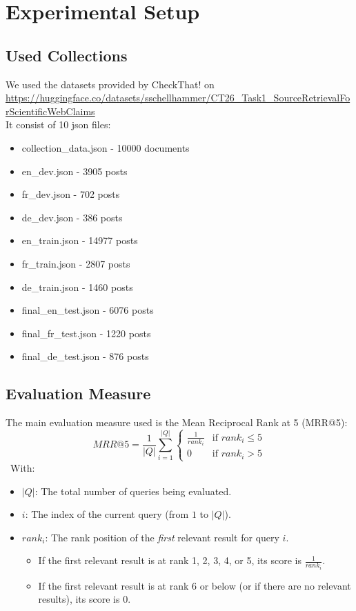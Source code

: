 \section{Experimental Setup}
\label{sec:setup}

\subsection{Used Collections}

We used the datasets provided by CheckThat! on \url{https://huggingface.co/datasets/sschellhammer/CT26_Task1_SourceRetrievalForScientificWebClaims} \\
It consist of 10 json files:
\begin{itemize}
	\item collection\_data.json - 10000 documents
	\item en\_dev.json - 3905 posts
	\item fr\_dev.json - 702 posts
	\item de\_dev.json - 386 posts
	\item en\_train.json - 14977 posts
	\item fr\_train.json - 2807 posts
	\item de\_train.json - 1460 posts
	\item final\_en\_test.json - 6076 posts
	\item final\_fr\_test.json - 1220 posts
	\item final\_de\_test.json - 876 posts
\end{itemize}

\subsection{Evaluation Measure}
The main evaluation measure used is the Mean Reciprocal Rank at 5 (MRR@5):
$$MRR@5 = \frac{1}{|Q|} \sum_{i=1}^{|Q|} \begin{cases} \frac{1}{rank_i} & \text{if } rank_i \le 5 \\ 0 & \text{if } rank_i > 5 \end{cases}$$
\
With:
\begin{itemize}
    \item \textbf{$|Q|$}: The total number of queries being evaluated.
    \item \textbf{$i$}: The index of the current query (from $1$ to $|Q|$).
    \item \textbf{$rank_i$}: The rank position of the \textit{first} relevant result for query $i$.
    \begin{itemize}
        \item If the first relevant result is at rank 1, 2, 3, 4, or 5, its score is $\frac{1}{rank_i}$.
        \item If the first relevant result is at rank 6 or below (or if there are no relevant results), its score is $0$.
    \end{itemize}
\end{itemize}

